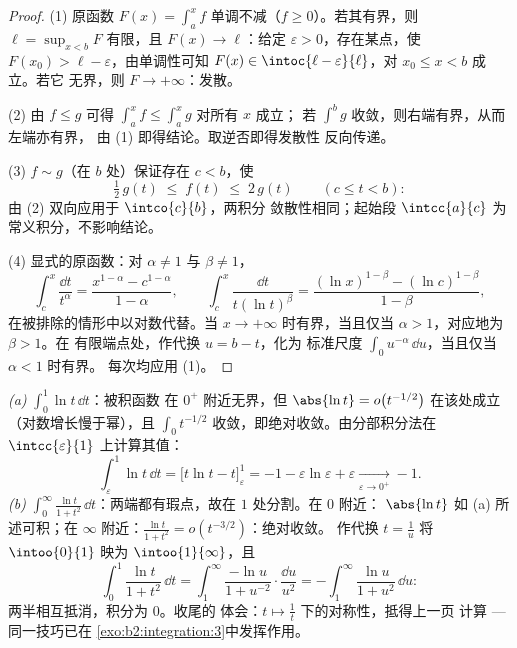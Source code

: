 \begin{proof}
(1) 原函数 $F(x) = \int_a^x f$ 单调不减（$f \geq
0$）。若其有界，则 $\ell = \sup_{x < b}F$ 有限，且
$F(x) \to \ell$：给定 $\varepsilon > 0$，存在某点，使 $F(x_0) > \ell -
\varepsilon$，由单调性可知 $F(x) \in
\intoc{\ell - \varepsilon}{\ell}$，对 $x_0 \leq x < b$ 成立。若它
无界，则 $F \to +\infty$：发散。

(2) 由 $f \leq g$ 可得 $\int_a^x f \leq \int_a^x g$ 对所有 $x$ 成立；
若 $\int^b g$ 收敛，则右端有界，从而左端亦有界，
由 (1) 即得结论。取逆否即得发散性
反向传递。

(3) $f \sim g$（在 $b$ 处）保证存在 $c < b$，使
\[
\tfrac12\,g(t) \;\leq\; f(t) \;\leq\; 2\,g(t)
\qquad (c \leq t < b) :
\]
由 (2) 双向应用于 $\intco{c}{b}$，两积分
敛散性相同；起始段 $\intcc{a}{c}$ 为
常义积分，不影响结论。

(4) 显式的原函数：对 $\alpha \neq 1$ 与 $\beta \neq 1$，
\[
\int_c^x \frac{\dd t}{t^\alpha}
= \frac{x^{1-\alpha} - c^{1-\alpha}}{1 - \alpha},
\qquad
\int_c^x \frac{\dd t}{t(\ln t)^\beta}
= \frac{(\ln x)^{1-\beta} - (\ln c)^{1-\beta}}{1 - \beta},
\]
在被排除的情形中以对数代替。当 $x \to
+\infty$ 时有界，当且仅当 $\alpha > 1$，对应地为 $\beta > 1$。在
有限端点处，作代换 $u = b - t$，化为
标准尺度 $\int_0 u^{-\alpha}\,\dd u$，当且仅当 $\alpha < 1$ 时有界。
每次均应用 (1)。
\end{proof}

\begin{example}\label{ex:b2:integration:warmups}
\emph{(a)} $\displaystyle\int_0^1 \ln t\,\dd t$：被积函数
在 $0^+$ 附近无界，但 $\abs{\ln t} = o\bigl(t^{-1/2}\bigr)$
在该处成立（对数增长慢于幂），且 $\int_0 t^{-1/2}$
收敛，即绝对收敛。由分部积分法在
$\intcc{\varepsilon}{1}$ 上计算其值：
\[
\int_\varepsilon^1 \ln t\,\dd t
= \bigl[t\ln t - t\bigr]_\varepsilon^1
= -1 - \varepsilon\ln\varepsilon + \varepsilon
\xrightarrow[\varepsilon\to0^+]{} -1 .
\]
\emph{(b)} $\displaystyle\int_0^\infty \frac{\ln t}{1 +
t^2}\,\dd t$：两端都有瑕点，故在 $1$ 处分割。在 $0$ 附近：
$\abs{\ln t}$ 如 (a) 所述可积；在 $\infty$ 附近：$\frac{\ln
t}{1+t^2} = o(t^{-3/2})$：绝对收敛。
作代换 $t = \frac1u$ 将 $\intoo{0}{1}$ 映为
$\intoo{1}{\infty}$，且
\[
\int_0^1 \frac{\ln t}{1+t^2}\,\dd t
= \int_1^{\infty} \frac{-\ln u}{1 + u^{-2}}\cdot
\frac{\dd u}{u^2}
= -\int_1^\infty \frac{\ln u}{1+u^2}\,\dd u :
\]
两半相互抵消，积分为 $0$。收尾的
体会：$t \mapsto \frac1t$ 下的对称性，抵得上一页
计算 --- 同一技巧已在
\cref{exo:b2:integration:3}中发挥作用。
\end{example}

